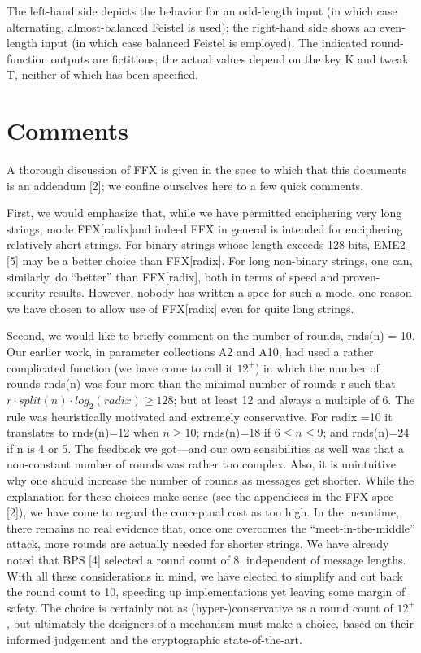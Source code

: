 The left-hand side depicts the behavior for an odd-length input (in which case alternating, almost-balanced Feistel is used); the right-hand side shows an even-length input (in which case balanced Feistel is employed). The indicated round-function outputs are fictitious; the actual values depend on the key K and tweak T, neither of which has been specified.

\section{Comments}
A thorough discussion of FFX is given in the spec to which that this documents is an addendum [2]; we confine ourselves here to a few quick comments.

First, we would emphasize that, while we have permitted enciphering very long strings, mode FFX[radix]and indeed FFX in general is intended for enciphering relatively short strings. For binary strings whose length exceeds 128 bits, EME2 [5] may be a better choice than FFX[radix]. For long non-binary strings, one can, similarly, do “better” than FFX[radix], both in terms of speed and proven-security results. However, nobody has written a spec for such a mode, one reason we have chosen to allow use of FFX[radix] even for quite long strings.

Second, we would like to briefly comment on the number of rounds, rnds(n) = 10. Our earlier work, in parameter collections A2 and A10, had used a rather complicated function (we have come to call it $12^+$) in which the number of rounds rnds(n) was four more than the minimal number of rounds r such that $r \cdot split(n) \cdot log_2(radix) \geq 128$; but at least 12 and always a multiple of 6. The rule was heuristically motivated and extremely conservative. For radix =10 it translates to rnds(n)=12 when $n \geq 10$; rnds(n)=18 if $6 \leq n \leq 9$; and rnds(n)=24 if n is 4 or 5. The feedback we got—and our own sensibilities as well was that a non-constant number of rounds was rather too complex. Also, it is unintuitive why one should increase the number of rounds as messages get shorter. While the explanation for these choices make sense (see the appendices in the FFX spec [2]), we have come to regard the conceptual cost as too high. In the meantime, there remains no real evidence that, once one overcomes the “meet-in-the-middle” attack, more rounds are actually needed for shorter strings. We have already noted that BPS [4] selected a round count of 8, independent of message lengths. With all these considerations in mind, we have elected to simplify and cut back the round count to 10, speeding up implementations yet leaving some margin of safety. The choice is certainly not as (hyper-)conservative as a round count of $12^+$, but ultimately the designers of a mechanism must make a choice, based on their informed judgement and the cryptographic state-of-the-art.

